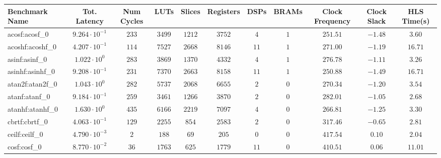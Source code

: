 \begin{tabular}{|l|c|c|c|c|c|c|c|c|c|c|}
\hline
Benchmark Name               & Tot. Latency            & Num Cycles & LUTs       & Slices    & Registers  & DSPs    & BRAMs & Clock Frequency & Clock Slack & HLS Time(s) \\
\hline
acosf:acosf\_0               & $ 9.264 \cdot 10^{-1} $ & $ 233    $ & $ 3499   $ & $ 1212  $ & $ 3752   $ & $ 4   $ & $ 1 $ & $ 251.51      $ & $ -1.48   $ & $ 3.60    $ \\
acoshf:acoshf\_0             & $ 4.207 \cdot 10^{-1} $ & $ 114    $ & $ 7527   $ & $ 2668  $ & $ 8146   $ & $ 11  $ & $ 1 $ & $ 271.00      $ & $ -1.19   $ & $ 16.71   $ \\
asinf:asinf\_0               & $ 1.022 \cdot 10^{0}  $ & $ 283    $ & $ 3869   $ & $ 1370  $ & $ 4332   $ & $ 4   $ & $ 1 $ & $ 276.78      $ & $ -1.11   $ & $ 3.26    $ \\
asinhf:asinhf\_0             & $ 9.208 \cdot 10^{-1} $ & $ 231    $ & $ 7370   $ & $ 2663  $ & $ 8158   $ & $ 11  $ & $ 1 $ & $ 250.88      $ & $ -1.49   $ & $ 16.71   $ \\
atan2f:atan2f\_0             & $ 1.043 \cdot 10^{0}  $ & $ 282    $ & $ 5737   $ & $ 2068  $ & $ 6655   $ & $ 2   $ & $ 0 $ & $ 270.34      $ & $ -1.20   $ & $ 3.54    $ \\
atanf:atanf\_0               & $ 9.184 \cdot 10^{-1} $ & $ 259    $ & $ 3461   $ & $ 1266  $ & $ 3870   $ & $ 2   $ & $ 0 $ & $ 282.01      $ & $ -1.05   $ & $ 2.68    $ \\
atanhf:atanhf\_0             & $ 1.630 \cdot 10^{0}  $ & $ 435    $ & $ 6166   $ & $ 2219  $ & $ 7097   $ & $ 4   $ & $ 0 $ & $ 266.81      $ & $ -1.25   $ & $ 3.30    $ \\
cbrtf:cbrtf\_0               & $ 4.063 \cdot 10^{-1} $ & $ 129    $ & $ 2255   $ & $ 854   $ & $ 2583   $ & $ 2   $ & $ 0 $ & $ 317.46      $ & $ -0.65   $ & $ 2.81    $ \\
ceilf:ceilf\_0               & $ 4.790 \cdot 10^{-3} $ & $ 2      $ & $ 188    $ & $ 69    $ & $ 205    $ & $ 0   $ & $ 0 $ & $ 417.54      $ & $ 0.10    $ & $ 2.04    $ \\
cosf:cosf\_0                 & $ 8.770 \cdot 10^{-2} $ & $ 36     $ & $ 1763   $ & $ 625   $ & $ 1779   $ & $ 11  $ & $ 0 $ & $ 410.51      $ & $ 0.06    $ & $ 11.01   $ \\

\end{tabular}

